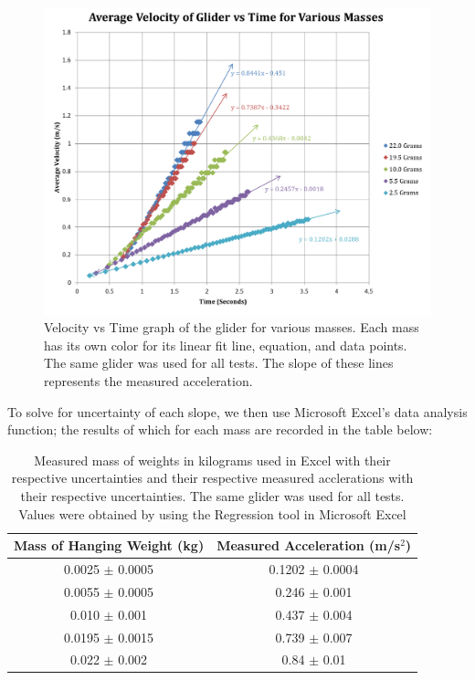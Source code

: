 \documentclass[titlepage]{article}
\begin{document}
\begin{figure}[ht]
    \centering
    \includegraphics[width=5.0in]{Graph.png}
    \caption{Velocity vs Time graph of the glider for various masses. Each mass has its own color for its linear fit line, equation, and data points. The same glider was used for all tests. The slope of these lines represents the measured acceleration.}
\end{figure}

\pagebreak

To solve for uncertainty of each slope, we then use Microsoft Excel's data analysis function; the results of which for each mass are recorded in the table below:

\begin{table}[!htbp]
\renewcommand{\arraystretch}{1.3}
\centering
\begin{tabular}{c|c}
    \hline
    \hline
    Mass of Hanging Weight (kg) &  Measured Acceleration (m/s$^2$)\\
    \hline
    \hline

    0.0025 $\pm$ 0.0005 &  0.1202 $\pm$ 0.0004 \\
    \hline

    0.0055 $\pm$ 0.0005 &  0.246 $\pm$ 0.001 \\
    \hline

    0.010 $\pm$ 0.001 &  0.437 $\pm$ 0.004 \\
    \hline

    0.0195 $\pm$ 0.0015 &  0.739 $\pm$ 0.007 \\
    \hline

    0.022 $\pm$ 0.002 &  0.84 $\pm$ 0.01 \\
    \hline
\end{tabular}
\caption{Measured mass of weights in kilograms used in Excel with their respective uncertainties and their respective measured acclerations with their respective uncertainties. The same glider was used for all tests. Values were obtained by using the Regression tool in Microsoft Excel}
\end{table}
\end{document}
